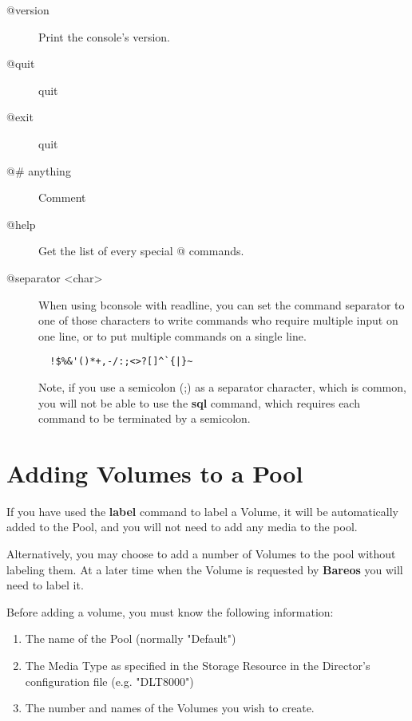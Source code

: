 \begin{description}
\item [@version]
   Print the console's version.

\item [@quit]
   quit

\item [@exit]
   quit

\item [@\# anything]
   Comment

\item [@help]
   Get the list of every special @ commands.

\item [@separator {\textless}char{\textgreater}]
  When using bconsole with readline, you can set the command separator to one
  of those characters to write commands who require multiple input on one line,
  or to put multiple commands on a single line.
\begin{verbatim}
  !$%&'()*+,-/:;<>?[]^`{|}~
\end{verbatim}

  Note, if you use a semicolon (;) as a separator character, which is
  common, you will not be able to use the {\bf sql} command, which
  requires each command to be terminated by a semicolon.

\end{description}


\section{Adding Volumes to a Pool}


If you have used the {\bf label} command to label a Volume, it will be
automatically added to the Pool, and you will not need to add any media to the
pool.

Alternatively, you may choose to add a number of Volumes to the pool without
labeling them. At a later time when the Volume is requested by {\bf Bareos}
you will need to label it.

Before adding a volume, you must know the following information:

\begin{enumerate}
\item The name of the Pool (normally "Default")
\item The Media Type as specified in the Storage Resource  in the Director's
   configuration file (e.g. "DLT8000")
\item The number and names of the Volumes you wish to create.
\end{enumerate}

